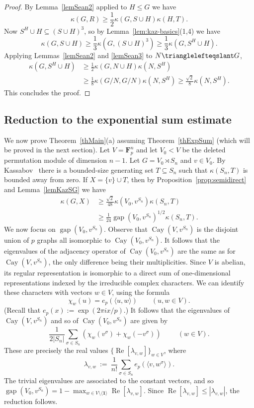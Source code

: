 \documentclass[11pt]{amsart}
\numberwithin{equation}{section}
\theoremstyle{remark}
\newcommand{\op}{\operatorname}
\newcommand{\Cay}{\op{Cay}}
\newcommand{\gap}{\op{gap}}
\newcommand{\F}{\mathbf{F}}
\renewcommand{\Re}{\op{Re}}
\newcommand\br[1]{{\left(#1\right)}}
\newcommand{\gen}[1]{\langle{#1}\rangle}
\def\one{\mathbf{1}}
\def\kaz{\kappa}
\def\sgp{\leqslant}
\def\nsgp{\trianglelefteqslant}
\begin{document}
\begin{proof}
    By Lemma~\ref{lemSean2} applied to $H \sgp G$ we have
    \[
        \kaz(G, R) \geq \frac12 \kaz(G, S \cup H) \kaz(H, T).
    \]
    Now $S^H \cup H \subseteq (S \cup H)^3$, so by Lemma~\ref{lem:kaz-basics}(1,4) we have
    \[
        \kaz(G, S \cup H) \ge \frac13 \kaz(G, (S \cup H)^3) \ge \frac13 \kaz(G, S^H \cup H).
    \]
    Applying Lemmas~\ref{lemSean2} and \ref{lemSean3} to $N \nsgp G$,
    \begin{align*}
        \kaz(G, S^H \cup H)
        &\ge \frac12 \kaz(G, N \cup H) \kaz(N, S^H) \\
        &\ge \frac18 \kaz(G/N, G/N) \kaz(N, S^H) \ge \frac{\sqrt2}8 \kaz(N, S^H).
    \end{align*}
    This concludes the proof.
\end{proof}



\subsection{Reduction to the exponential sum estimate}

We now prove Theorem~\ref{thMain}(a) assuming Theorem~\ref{thExpSum} (which will be proved in the next section).
Let $V= \F_p^n$ and let $V_0 < V$ be the deleted permutation module of dimension $n-1$.
Let $G = V_0 \rtimes S_n$ and $v \in V_0$.
By Kassabov~\cite{Kas07} there is a bounded-size generating set $T \subseteq S_n$ such that $\kaz(S_n, T)$ is bounded away from zero.
If $X = \{v\} \cup T$,
then by Proposition~\ref{prop:semidirect} and Lemma~\ref{lemKazSG} we have
\begin{align*}
        \kaz(G, X)
        &\ge \frac{\sqrt 2}{48} \kaz(V_0, v^{S_n}) \kaz(S_n, T)
         \\
        &\ge \frac{1}{24} \gap(V_0, v^{S_n})^{1/2} \kaz(S_n, T).
    \end{align*}
We now focus on $\gap(V_0, v^{S_n})$.
Observe that $\Cay(V,v^{S_n})$ is the disjoint union of $p$ graphs all isomorphic to $\Cay(V_0,v^{S_n})$.
It follows that the eigenvalues of the adjacency operator of $\Cay(V_0, v^{S_n})$ are the same as for
$\Cay(V, v^{S_n})$, the only difference being their multiplicities.
Since $V$ is abelian, its regular representation is isomorphic to a direct sum of one-dimensional representations
indexed by the irreducible complex characters.
We can identify these characters with vectors $w \in V$, using the formula
\[
    \chi_w(u) = e_p(\gen{u, w}) \qquad (u,w \in V).
\]
(Recall that $e_p(x) := \exp(2 \pi i x / p)$.)
It follows that the eigenvalues of $\Cay(V,v^{S_n})$ and so of $\Cay(V_0,v^{S_n})$ are given by
\[
    \frac1{2|S_n|} \sum_{\sigma \in S_n} \br{\chi_w(v^\sigma) + \chi_w(-v^{\sigma})} \hspace{1cm} (w \in V) .
\]
These are precisely the real values $\{ \Re[\lambda_{v,w}] \}_{w \in V}$, where
\[
    \lambda_{v,w} \> := \>
    \frac1{n!} \sum_{\sigma \in S_n} e_p (\gen{v, w^\sigma}) .
\]
The trivial eigenvalues are associated to the constant vectors, and so
$\gap(V_0,v^{S_n}) = 1 - \max_{w \in V \setminus \gen \one} \Re[\lambda_{v,w}]$.
 Since $\Re[\lambda_{v,w}] \le |\lambda_{v,w}|$, the reduction follows.
\end{document}
